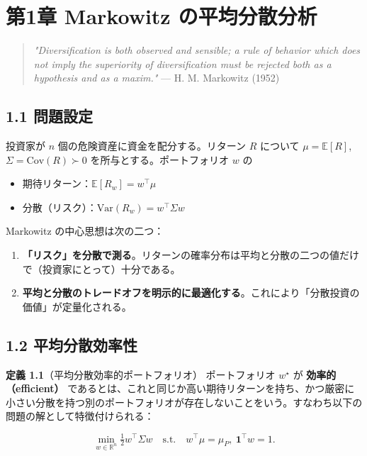 \documentclass[11pt,a4paper]{report}
\begin{document}
\noindent\hrulefill

\chapter{第1章 Markowitz の平均分散分析}

\begin{quote}
\emph{"Diversification is both observed and sensible; a rule of behavior which does not imply the superiority of diversification must be rejected both as a hypothesis and as a maxim."}  — H. M. Markowitz (1952)
\end{quote}

\section{1.1 問題設定}

投資家が $n$ 個の危険資産に資金を配分する。リターン $R$ について $\mu = \mathbb{E}[R]$, $\Sigma = \mathrm{Cov}(R) \succ 0$ を所与とする。ポートフォリオ $w$ の

\begin{itemize}
\item 期待リターン：$\mathbb{E}[R_w] = w^\top \mu$
\item 分散（リスク）：$\mathrm{Var}(R_w) = w^\top \Sigma w$
\end{itemize}

Markowitz の中心思想は次の二つ：

\begin{enumerate}
\item \textbf{「リスク」を分散で測る}。リターンの確率分布は平均と分散の二つの値だけで（投資家にとって）十分である。
\item \textbf{平均と分散のトレードオフを明示的に最適化する}。これにより「分散投資の価値」が定量化される。
\end{enumerate}

\section{1.2 平均分散効率性}

\textbf{定義 1.1}（平均分散効率的ポートフォリオ） ポートフォリオ $w^\star$ が \textbf{効率的（efficient）} であるとは、これと同じか高い期待リターンを持ち、かつ厳密に小さい分散を持つ別のポートフォリオが存在しないことをいう。すなわち以下の問題の解として特徴付けられる：

\[ \min_{w \in \mathbb{R}^n} \tfrac{1}{2} w^\top \Sigma w \quad \text{s.t.}\quad w^\top \mu = \mu_P,\ \mathbf{1}^\top w = 1. \tag{P} \]
\end{document}
